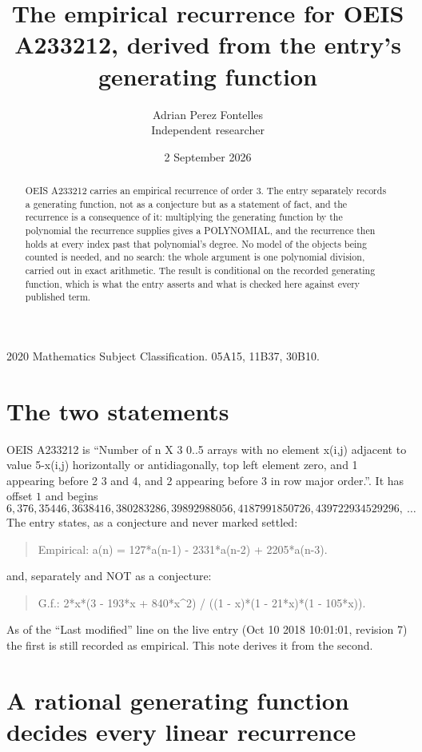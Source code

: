 \documentclass[11pt,a4paper]{article}
\title{The empirical recurrence for OEIS A233212, derived from the entry's generating function}
\author{Adrian Perez Fontelles\\ \small Independent researcher}
\date{2 September 2026}
\theoremstyle{plain}
\theoremstyle{definition}
\begin{document}
\maketitle

\begin{abstract}
OEIS A233212 carries an empirical recurrence of order $3$. The entry separately records a
generating function, not as a conjecture but as a statement of fact, and the recurrence is a
consequence of it: multiplying the generating function by the polynomial the recurrence
supplies gives a POLYNOMIAL, and the recurrence then holds at every index past that
polynomial's degree. No model of the objects being counted is needed, and no search: the
whole argument is one polynomial division, carried out in exact arithmetic. The result is
conditional on the recorded generating function, which is what the entry asserts and what is
checked here against every published term.
\end{abstract}

\noindent\small 2020 Mathematics Subject Classification. 05A15, 11B37, 30B10.\normalsize

\section{The two statements}

OEIS A233212 is ``Number of n X 3 0..5 arrays with no element x(i,j) adjacent to value 5-x(i,j) horizontally or antidiagonally, top left element zero, and 1 appearing before 2 3 and 4, and 2 appearing before 3 in row major order.''. It has offset $1$ and begins
\[
6, 376, 35446, 3638416, 380283286, 39892988056, 4187991850726, 439722934529296,\ \dots
\]
The entry states, as a conjecture and never marked settled:
\begin{quote}
Empirical: a(n) = 127*a(n-1) - 2331*a(n-2) + 2205*a(n-3).
\end{quote}
and, separately and NOT as a conjecture:
\begin{quote}
G.f.: 2*x*(3 - 193*x + 840*x\^{}2) / ((1 - x)*(1 - 21*x)*(1 - 105*x)).
\end{quote}
As of the ``Last modified'' line on the live entry (Oct 10 2018 10:01:01, revision 7) the first is still
recorded as empirical. This note derives it from the second.

\section{A rational generating function decides every linear recurrence}
\end{document}
